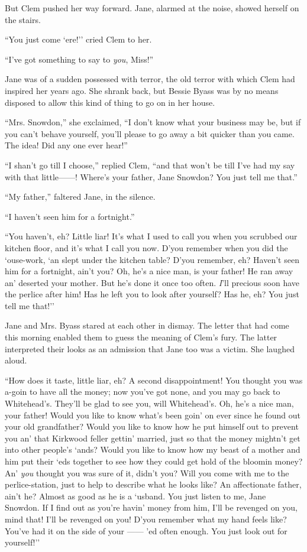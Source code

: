 But Clem pushed her way forward. Jane, alarmed at the noise, showed
herself on the stairs.

``You just come `ere!'' cried Clem to her.

``I've got something to say to \emph{you}, Miss!''

Jane was of a sudden possessed with terror, the old terror with which
Clem had inspired her years ago. She shrank back, but Bessie Byass was
by no means disposed to allow this kind of thing to go on in her house.

``Mrs. Snowdon,'' she exclaimed, ``I don't
{\protect\hypertarget{245}{}{}}know what your business may be, but if
you can't behave yourself, you'll please to go away a bit quicker than
you came. The idea! Did any one ever hear!''

``I shan't go till I choose,'' replied Clem, ``and that won't be till
I've had my say with that little{{------}}! Where's your father, Jane
Snowdon? You just tell me that.''

``My father,'' faltered Jane, in the silence.

``I haven't seen him for a fortnight.''

``You haven't, eh? Little liar! It's what I used to call you when you
scrubbed our kitchen floor, and it's what I call you now. D'you remember
when you did the `ouse-work, `an slept under the kitchen table? D'you
remember, eh? Haven't seen him for a fortnight, ain't you? Oh, he's a
nice man, is your father! He ran away an' deserted your mother. But he's
done it once too often. \emph{I}'ll precious soon have the perlice after
him! Has he left you to look after yourself? Has he, eh? You just tell
me that!''

Jane and Mrs. Byass stared at each other in dismay. The letter that had
come this morning enabled them to guess the meaning of Clem's fury. The
latter interpreted their {\protect\hypertarget{246}{}{}}looks as an
admission that Jane too was a victim. She laughed aloud.

``How does it taste, little liar, eh? A second disappointment! You
thought you was a-goin to have all the money; now you've got none, and
you may go back to Whitehead's. They'll be glad to see you, will
Whitehead's. Oh, he's a nice man, your father! Would you like to know
what's been goin' on ever since he found out your old grandfather? Would
you like to know how he put himself out to prevent you an' that Kirkwood
feller gettin' married, just so that the money mightn't get into other
people's `ands? Would you like to know how my beast of a mother and him
put their `eds together to see how they could get hold of the bloomin
money? An' \emph{you} thought you was sure of it, didn't you? Will you
come with me to the perlice-station, just to help to describe what he
looks like? An affectionate father, ain't he? Almost as good as he is a
`usband. You just listen to me, Jane Snowdon. If I find out as you're
havin' money from him, I'll be revenged on you, mind that! I'll be
revenged on you! D'you remember what my hand feels
{\protect\hypertarget{247}{}{}}like? You've had it on the side of your
{{------}} 'ed often enough. You just look out for yourself!''

